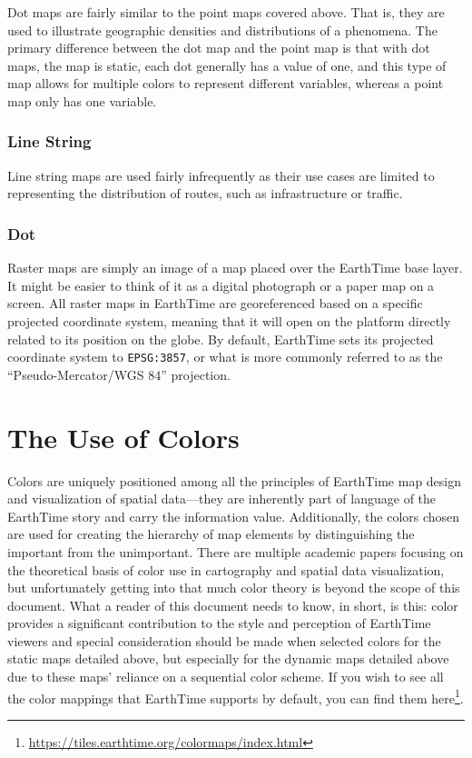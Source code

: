 \documentclass[
]{krantz}
\renewcommand{\href}[2]{#2\footnote{\url{#1}}}
\begin{document}
Dot maps are fairly similar to the point maps covered above. That is, they are used to illustrate geographic densities and distributions of a phenomena. The primary difference between the dot map and the point map is that with dot maps, the map is static, each dot generally has a value of one, and this type of map allows for multiple colors to represent different variables, whereas a point map only has one variable.

\hypertarget{line-string}{%
\subsubsection*{Line String}\label{line-string}}


Line string maps are used fairly infrequently as their use cases are limited to representing the distribution of routes, such as infrastructure or traffic.

\hypertarget{dot-1}{%
\subsubsection*{Dot}\label{dot-1}}


Raster maps are simply an image of a map placed over the EarthTime base layer. It might be easier to think of it as a digital photograph or a paper map on a screen. All raster maps in EarthTime are georeferenced based on a specific projected coordinate system, meaning that it will open on the platform directly related to its position on the globe. By default, EarthTime sets its projected coordinate system to \texttt{EPSG:3857}, or what is more commonly referred to as the ``Pseudo-Mercator/WGS 84'' projection.

\hypertarget{the-use-of-colors}{%
\section{The Use of Colors}\label{the-use-of-colors}}

Colors are uniquely positioned among all the principles of EarthTime map design and visualization of spatial data---they are inherently part of language of the EarthTime story and carry the information value. Additionally, the colors chosen are used for creating the hierarchy of map elements by distinguishing the important from the unimportant. There are multiple academic papers focusing on the theoretical basis of color use in cartography and spatial data visualization, but unfortunately getting into that much color theory is beyond the scope of this document. What a reader of this document needs to know, in short, is this: color provides a significant contribution to the style and perception of EarthTime viewers and special consideration should be made when selected colors for the static maps detailed above, but especially for the dynamic maps detailed above due to these maps' reliance on a sequential color scheme. If you wish to see all the color mappings that EarthTime supports by default, you can find them \href{https://tiles.earthtime.org/colormaps/index.html}{here}.
\end{document}
